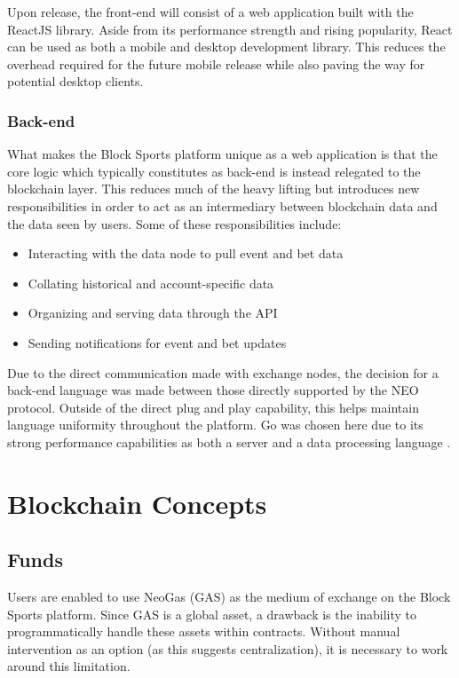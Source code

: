 \documentclass{article}
\begin{document}
Upon release, the front-end will consist of a web application built with the ReactJS library. Aside from its performance strength and rising popularity, React can be used as both a mobile and desktop development library. This reduces the overhead required for the future mobile release while also paving the way for potential desktop clients.

		\subsubsection{Back-end}
What makes the Block Sports platform unique as a web application is that the core logic which typically constitutes as back-end is instead relegated to the blockchain layer. This reduces much  of the heavy lifting but introduces new responsibilities in order to act as an intermediary between blockchain data and the data seen by users. Some of these responsibilities include: 

\begin{itemize}
	\item Interacting with the data node to pull event and bet data
	\item Collating historical and account-specific data
	\item Organizing and serving data through the API
	\item Sending notifications for event and bet updates
\end{itemize}

Due to the direct communication made with exchange nodes, the decision for a back-end language was made between those directly supported by the NEO protocol. Outside of the direct plug and play capability, this helps maintain language uniformity throughout the platform. Go was chosen here due to its strong performance capabilities as both a server and a data processing language . 

\section{Blockchain Concepts}
	\subsection{Funds}
Users are enabled to use NeoGas (GAS) as the medium of exchange on the Block Sports platform. Since GAS is a global asset, a drawback is the inability to programmatically handle these assets within contracts. Without manual intervention as an option (as this suggests centralization), it is necessary to work around this limitation. 
\end{document}
